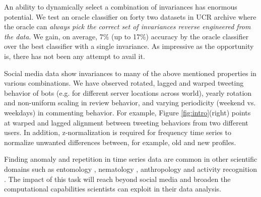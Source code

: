 An ability to dynamically select a combination of invariances has enormous potential. We test an oracle classifier on forty two datasets in UCR archive \cite{UCRArchive} where the oracle can {\it always pick the correct set of invariances reverse engineered from the data}. We gain, on average, 7\% (up to 17\%) accuracy by the oracle classifier over the best classifier with a single invariance. As impressive as the opportunity is, there has not been any attempt to avail it. 




Social media data show invariances to many of the above mentioned properties in various combinations. We have observed rotated, lagged and warped tweeting behavior of bots (e.g. for different server locations across world), yearly rotation and non-uniform scaling in review behavior, and varying periodicity (weekend vs. weekdays) in commenting behavior. For example, Figure \ref{fig:intro}(right) points at warped and lagged alignment between tweeting behaviors from two different users. In addition, z-normalization is required for frequency time series to normalize unwanted differences between, for example, old and new profiles.



Finding anomaly and repetition in time series data are common in other scientific domains such as entomology \cite{Mueen:09a}, nematology \cite{Brown:13}, anthropology \cite{zhu:09} and activity recognition \cite{Mueen:11}. The impact of this task will reach beyond social media and broaden the computational capabilities scientists can exploit in their data analysis.

